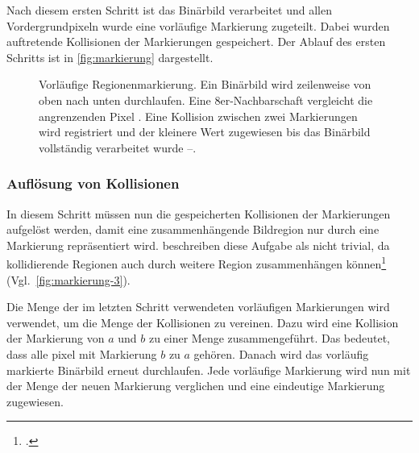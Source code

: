 Nach diesem ersten Schritt ist das Binärbild verarbeitet und allen Vordergrundpixeln wurde eine vorläufige Markierung
 zugeteilt. Dabei wurden auftretende Kollisionen der Markierungen gespeichert. Der Ablauf des ersten Schritts ist in
 \autoref{fig:markierung} dargestellt.
\begin{figure}[!ht]
	\centering
	\subfigure[]{
		\label{fig:markierung-binaer}
		
	}
	\subfigure[]{
		\label{fig:markierung-1}
		
	}
	\subfigure[]{
		\label{fig:markierung-2}
		
	}
	\subfigure[]{
		\label{fig:markierung-3}
		
	}
	\caption{Vorläufige Regionenmarkierung. Ein Binärbild  wird zeilenweise von
	 oben nach unten durchlaufen. Eine 8er-Nachbarschaft vergleicht die angrenzenden Pixel .
	 Eine Kollision zwischen zwei Markierungen wird registriert und der kleinere Wert zugewiesen bis das Binärbild
	 vollständig verarbeitet wurde --.}
	\label{fig:markierung}
\end{figure}


\subsubsection{Auflösung von Kollisionen} %
\label{sec:auflösung_von_kollisionen}

In diesem Schritt müssen nun die gespeicherten Kollisionen der Markierungen aufgelöst werden, damit eine
 zusammenhängende Bildregion nur durch eine Markierung repräsentiert wird. \citeauthor{burger05} beschreiben diese
 Aufgabe  als nicht trivial, da kollidierende Regionen auch durch weitere Region zusammenhängen
 können\footcite[Vgl.][S.~205]{burger05} (Vgl.~\autoref{fig:markierung-3}).

Die Menge der im letzten Schritt verwendeten vorläufigen Markierungen wird verwendet, um die Menge der Kollisionen
 zu vereinen. Dazu wird eine Kollision der Markierung von $a$ und $b$ zu einer Menge zusammengeführt. Das bedeutet,
 dass alle \gls{pixel} mit Markierung $b$ zu $a$ gehören. Danach wird das vorläufig markierte Binärbild erneut
 durchlaufen. Jede vorläufige Markierung wird nun mit der Menge der neuen Markierung verglichen und eine eindeutige
 Markierung zugewiesen.

